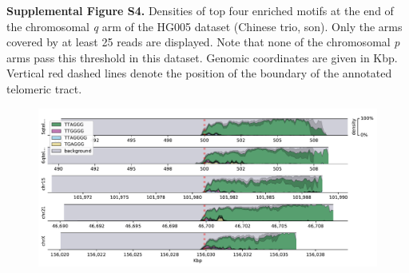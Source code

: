\documentclass{article}
\begin{document}

\noindent \textbf{Supplemental Figure S4.}
Densities of top four enriched motifs at the end of the chromosomal \textit{q} arm of the HG005 dataset (Chinese trio, son).
Only the arms covered by at least 25 reads are displayed.
Note that none of the chromosomal \textit{p} arms pass this threshold in this dataset.
Genomic coordinates are given in Kbp.
Vertical red dashed lines denote the position of the boundary of the annotated telomeric tract.

\begin{figure}[h] \centering
\includegraphics[width=\textwidth,keepaspectratio]{renders/figures/Figure-S4.pdf}
\end{figure}
\end{document}
